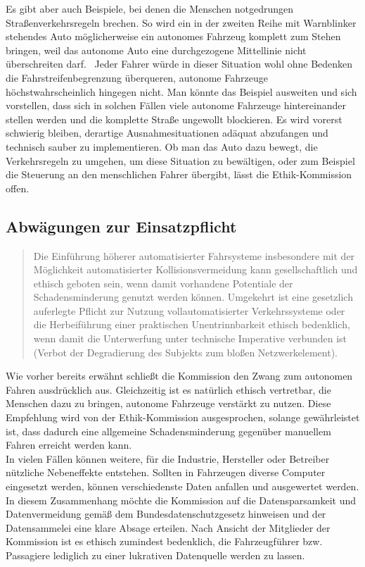 \documentclass[twoside,a4paper,12pt]{article}
\begin{document}
Es gibt aber auch Beispiele, bei denen die Menschen notgedrungen Straßenverkehrsregeln brechen. So wird ein in der zweiten Reihe mit Warnblinker stehendes Auto
möglicherweise ein autonomes Fahrzeug komplett zum Stehen bringen, weil das autonome Auto eine durchgezogene Mittellinie nicht überschreiten darf.~\cite{zeit1} Jeder Fahrer würde in dieser Situation wohl ohne Bedenken die Fahrstreifenbegrenzung überqueren, autonome Fahrzeuge höchstwahrscheinlich hingegen nicht. Man könnte das
Beispiel ausweiten und sich vorstellen, dass sich in solchen Fällen viele autonome Fahrzeuge hintereinander stellen werden und die komplette Straße ungewollt blockieren. Es wird vorerst schwierig bleiben, derartige Ausnahmesituationen adäquat abzufangen und technisch sauber zu implementieren. Ob man das Auto dazu bewegt, die
Verkehrsregeln zu umgehen, um diese Situation zu bewältigen, oder zum Beispiel die Steuerung an den menschlichen Fahrer übergibt, lässt die Ethik-Kommission offen.\\ 

\subsection{Abwägungen zur Einsatzpflicht} \label{AbwaegungenZurEinsatzpflicht}

\begin{quote}
\glqq
Die Einführung höherer automatisierter Fahrsysteme insbesondere mit der Möglichkeit
automatisierter Kollisionsvermeidung kann gesellschaftlich und ethisch geboten sein,
wenn damit vorhandene Potentiale der Schadensminderung genutzt werden können.
Umgekehrt ist eine gesetzlich auferlegte Pflicht zur Nutzung vollautomatisierter Verkehrssysteme oder die Herbeiführung 
einer praktischen Unentrinnbarkeit ethisch bedenklich, wenn damit die Unterwerfung unter technische Imperative verbunden 
ist (Verbot der Degradierung des Subjekts zum bloßen Netzwerkelement).\grqq\mbox{~\cite[S. 11]{ek}}
\end{quote}

Wie vorher bereits erwähnt schließt die Kommission den Zwang zum autonomen Fahren ausdrücklich aus. Gleichzeitig ist es natürlich ethisch vertretbar, die Menschen dazu zu bringen, autonome Fahrzeuge verstärkt zu nutzen. Diese Empfehlung wird von der Ethik-Kommission ausgesprochen, solange gewährleistet ist, dass dadurch eine allgemeine Schadensminderung gegenüber manuellem Fahren erreicht werden kann. \\

In vielen Fällen können weitere, für die Industrie, Hersteller oder Betreiber nützliche Nebeneffekte entstehen. Sollten in Fahrzeugen diverse Computer eingesetzt werden, können verschiedenste Daten anfallen und ausgewertet werden. In diesem Zusammenhang möchte die Kommission auf die Datensparsamkeit und Datenvermeidung gemäß dem Bundesdatenschutzgesetz hinweisen und der Datensammelei eine klare Absage erteilen. Nach Ansicht der Mitglieder der Kommission ist es ethisch zumindest bedenklich, die Fahrzeugführer bzw. Passagiere lediglich zu einer lukrativen Datenquelle werden zu lassen.\\
\end{document}
